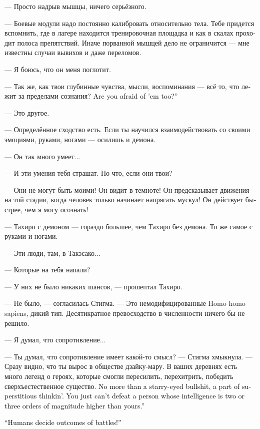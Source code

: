 \documentclass[a4paper,12pt,fleqn]{book}\usepackage{cooltooltips}\usepackage{polyglossia}\setdefaultlanguage[babelshorthands=true]{russian}\setotherlanguage{english}\defaultfontfeatures{Ligatures=TeX,Mapping=tex-text} \usepackage{xcolor}\definecolor{lightgray}{HTML}{bbbbbb}\color{lightgray}\newcommand{\ml}[3]{\textenglish{\textcolor{black}{#3}}}
\begin{document}
{--- Просто надрыв мышцы, ничего серьёзного.

--- Боевые модули надо постоянно калибровать относительно тела.
Тебе придется вспомнить, где в лагере находится тренировочная площадка и как в скалах проходит полоса препятствий.
Иначе порванной мышцей дело не ограничится --- мне известны случаи вывихов и даже переломов.

--- Я боюсь, что он меня поглотит.

--- Так же, как твои глубинные чувства, мысли, воспоминания --- всё то, что лежит за пределами сознания?
\ml{$0$}
{Их ты тоже боишься?}
{Are you afraid of 'em too?''}

--- Это другое.

--- Определённое сходство есть.
Если ты научился взаимодействовать со своими эмоциями, руками, ногами --- осилишь и демона.

--- Он так много умеет...

--- И эти умения тебя страшат.
Но что, если они твои?

--- Они не могут быть моими!
Он видит в темноте!
Он предсказывает движения на той стадии, когда человек только начинает напрягать мускул!
Он действует быстрее, чем я могу осознать!

--- Тахиро с демоном --- гораздо большее, чем Тахиро без демона.
То же самое с руками и ногами.

--- Эти люди, там, в Такэсако...

--- Которые на тебя напали?

--- У них не было никаких шансов, --- прошептал Тахиро.

--- Не было, --- согласилась Стигма.
--- Это немодифицированные Homo homo sapiens, дикий тип.
Десятикратное превосходство в численности ничего бы не решило.

--- Я думал, что сопротивление...

--- Ты думал, что сопротивление имеет какой-то смысл? --- Стигма хмыкнула.
--- Сразу видно, что ты вырос в обществе дзайку-мару.
В ваших деревнях есть много легенд о героях, которые смогли пересилить, перехитрить, победить сверхъестественное существо.
\ml{$0$}
{Всё это прекраснодушная чушь, часть мифологического сознания.}
{No more than a starry-eyed bullshit, a part of superstitious thinkin'.}
\ml{$0$}
{Ты просто не можешь победить того, чей интеллект превышает твой на два-три порядка.}
{You just can't defeat a person whose intelligence is two or three orders of magnitude higher than yours.''}

\ml{$0$}
{--- Люди решали исход сражений!}
{``Humans decide outcomes of battles!''}

}
\end{document}
